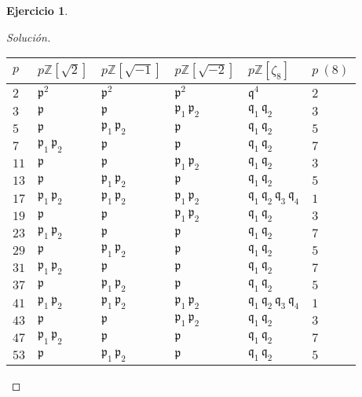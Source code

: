 \documentclass{article}
\newcounter{tarea}
\theoremstyle{definition}
\newtheorem{ejercicio}{Ejercicio}[tarea]
\newenvironment{solucion}{\begin{proof}[Solución]}{\end{proof}}
\newcommand{\ZZ}{\mathbb{Z}}
\begin{document}
\begin{ejercicio}
\begin{solucion}
\begin{center}
\renewcommand{\arraystretch}{1.25}
\begin{tabular}{x{1cm}x{1.5cm}x{1.5cm}x{1.5cm}x{1.5cm}x{1cm}}
  $p$ & $p\ZZ[\sqrt{2}]$ & $p\ZZ[\sqrt{-1}]$ & $p\ZZ[\sqrt{-2}]$ & $p\ZZ[\zeta_8]$ & $p~(8)$ \tabularnewline
\hline
$2$ & $\mathfrak{p}^2$ & $\mathfrak{p}^2$ & $\mathfrak{p}^2$ & $\mathfrak{q}^4$ & $2$ \tabularnewline
\hline
$3$ & $\mathfrak{p}$ & $\mathfrak{p}$ & $\mathfrak{p}_1\,\mathfrak{p}_2$ & $\mathfrak{q}_1\,\mathfrak{q}_2$ & $3$ \tabularnewline
\hline
$5$ & $\mathfrak{p}$ & $\mathfrak{p}_1\,\mathfrak{p}_2$ & $\mathfrak{p}$ & $\mathfrak{q}_1\,\mathfrak{q}_2$ & $5$ \tabularnewline
\hline
$7$ & $\mathfrak{p}_1\,\mathfrak{p}_2$ & $\mathfrak{p}$ & $\mathfrak{p}$ & $\mathfrak{q}_1\,\mathfrak{q}_2$ & $7$ \tabularnewline
\hline
$11$ & $\mathfrak{p}$ & $\mathfrak{p}$ & $\mathfrak{p}_1\,\mathfrak{p}_2$ & $\mathfrak{q}_1\,\mathfrak{q}_2$ & $3$ \tabularnewline
\hline
$13$ & $\mathfrak{p}$ & $\mathfrak{p}_1\,\mathfrak{p}_2$ & $\mathfrak{p}$ & $\mathfrak{q}_1\,\mathfrak{q}_2$ & $5$ \tabularnewline
\hline
$17$ & $\mathfrak{p}_1\,\mathfrak{p}_2$ & $\mathfrak{p}_1\,\mathfrak{p}_2$ & $\mathfrak{p}_1\,\mathfrak{p}_2$ & $\mathfrak{q}_1\,\mathfrak{q}_2\,\mathfrak{q}_3\,\mathfrak{q}_4$ & $1$ \tabularnewline
\hline
$19$ & $\mathfrak{p}$ & $\mathfrak{p}$ & $\mathfrak{p}_1\,\mathfrak{p}_2$ & $\mathfrak{q}_1\,\mathfrak{q}_2$ & $3$ \tabularnewline
\hline
$23$ & $\mathfrak{p}_1\,\mathfrak{p}_2$ & $\mathfrak{p}$ & $\mathfrak{p}$ & $\mathfrak{q}_1\,\mathfrak{q}_2$ & $7$ \tabularnewline
\hline
$29$ & $\mathfrak{p}$ & $\mathfrak{p}_1\,\mathfrak{p}_2$ & $\mathfrak{p}$ & $\mathfrak{q}_1\,\mathfrak{q}_2$ & $5$ \tabularnewline
\hline
$31$ & $\mathfrak{p}_1\,\mathfrak{p}_2$ & $\mathfrak{p}$ & $\mathfrak{p}$ & $\mathfrak{q}_1\,\mathfrak{q}_2$ & $7$ \tabularnewline
\hline
$37$ & $\mathfrak{p}$ & $\mathfrak{p}_1\,\mathfrak{p}_2$ & $\mathfrak{p}$ & $\mathfrak{q}_1\,\mathfrak{q}_2$ & $5$ \tabularnewline
\hline
$41$ & $\mathfrak{p}_1\,\mathfrak{p}_2$ & $\mathfrak{p}_1\,\mathfrak{p}_2$ & $\mathfrak{p}_1\,\mathfrak{p}_2$ & $\mathfrak{q}_1\,\mathfrak{q}_2\,\mathfrak{q}_3\,\mathfrak{q}_4$ & $1$ \tabularnewline
\hline
$43$ & $\mathfrak{p}$ & $\mathfrak{p}$ & $\mathfrak{p}_1\,\mathfrak{p}_2$ & $\mathfrak{q}_1\,\mathfrak{q}_2$ & $3$ \tabularnewline
\hline
$47$ & $\mathfrak{p}_1\,\mathfrak{p}_2$ & $\mathfrak{p}$ & $\mathfrak{p}$ & $\mathfrak{q}_1\,\mathfrak{q}_2$ & $7$ \tabularnewline
\hline
$53$ & $\mathfrak{p}$ & $\mathfrak{p}_1\,\mathfrak{p}_2$ & $\mathfrak{p}$ & $\mathfrak{q}_1\,\mathfrak{q}_2$ & $5$ \tabularnewline

\end{tabular}
\end{center}
\end{solucion}
\end{ejercicio}
\end{document}
